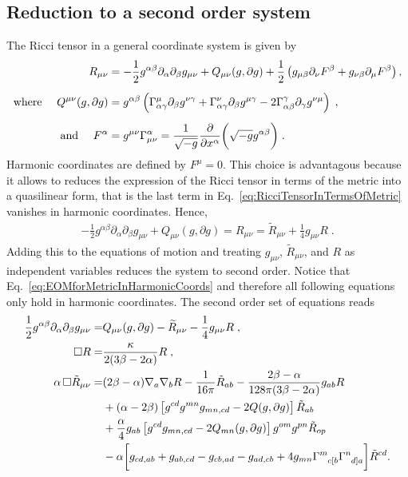 \documentclass[a4paper,oneside,openany,11pt]{memoir}
\numberwithin{equation}{section} %
\begin{document}
\subsection{Reduction to a second order system}

The Ricci tensor in a general coordinate system is given by
\begin{align}
	\label{eq:RicciTensorInTermsOfMetric}
	R_{\mu\nu}&=-\frac{1}{2}g^{\alpha\beta}\partial_{\alpha}\partial_{\beta}g_{\mu\nu}+Q_{\mu\nu}(g,\partial g)+\frac{1}{2}
\left(g_{\mu\beta}\partial_\nu F^\beta+g_{\nu\beta}\partial_\mu F^\beta\right),
	\\[0.5em]\notag
	\text{where }\quad
	Q^{\mu\nu}(g,\partial g)&=g^{\alpha\beta}\left(\Gamma_{\alpha\gamma}^{\mu}\partial_{\beta} g^{\nu\gamma}+\Gamma_{\alpha\gamma}^{\nu}\partial_{\beta} g^{\mu\gamma}-2\Gamma_{\alpha\beta}^{\gamma}\partial_{\gamma} g^{\nu\mu}\right)\;,
	\\[0.5em]\notag
	\text{and }\quad
	F^\alpha &= g^{\mu\nu}\Gamma_{\mu\nu}^\alpha = \frac{1}{\sqrt{-g}}\frac{\partial}{\partial x^\alpha}\bigg(\sqrt{-g}g^{\alpha\beta}\bigg)\;.
\end{align}
Harmonic coordinates are defined by $F^{\mu} = 0$. This choice is advantagous because it allows to reduces the expression of the Ricci tensor in terms of the metric into a quasilinear form, that is the last term in Eq.~\eqref{eq:RicciTensorInTermsOfMetric} vanishes in harmonic coordinates. Hence, 
\begin{align}
	\label{eq:EOMforMetricInHarmonicCoords}
	-\frac{1}{2}g^{\alpha\beta}\partial_{\alpha}\partial_{\beta}g_{\mu\nu}+Q_{\mu\nu}(g,\partial g) = R_{\mu\nu} = \widetilde{R}_{\mu\nu}
+\frac{1}{4}g_{\mu\nu}R\;.
\end{align}
Adding this to the equations of motion and treating $g_{\mu\nu}$, $\widetilde{R}_{\mu\nu}$, and $R$ as independent variables reduces the system to second order. Notice that Eq.~\eqref{eq:EOMforMetricInHarmonicCoords} and therefore all following equations only hold in harmonic coordinates. The second order set of equations reads
\begin{align}
	\frac{1}{2}g^{\alpha\beta}\partial_{\alpha}\partial_{\beta}g_{\mu\nu} = &Q_{\mu\nu}(g,\partial g)-\widetilde{R}_{\mu\nu}
-\frac{1}{4}g_{\mu\nu}R\;, 	\label{eom:metric}
	\\
	\square R = &\frac{\kappa}{2(3\beta-2\alpha)}R\;, \label{eom:ricci_scalar}
	\\
	\alpha\,\square \tilde{R}_{\mu\nu} = &
	(2 \beta - \alpha) \nabla_a \nabla_b R - \frac{1}{16 \pi} \tilde{R}_{ab} - \frac{2 \beta - \alpha}{128\pi(3\beta - 2 \alpha)} g_{ab} R \nonumber \\
&+(\alpha - 2 \beta)\left[g^{cd}g^{mn} g_{mn,cd} - 2 Q(g,\partial g) \right]\tilde{R}_{ab} \nonumber \\
&+\frac{\alpha}{4} g_{ab} \left[ g^{cd}g_{mn,cd} - 2 Q_{mn} (g,\partial g) \right] g^{om}g^{pn} \tilde{R}_{op} \nonumber \\
&- \alpha \bigg[ g_{cd,ab} + g_{ab,cd} - g_{cb,ad} - g_{ad,cb} +4 g_{mn} \Gamma\indices{^m_{c[b}} \Gamma\indices{^n_{d]a}} \bigg] \tilde{R}^{cd}. 	\label{eom:ricci_tensor}
\end{align}
\end{document}
